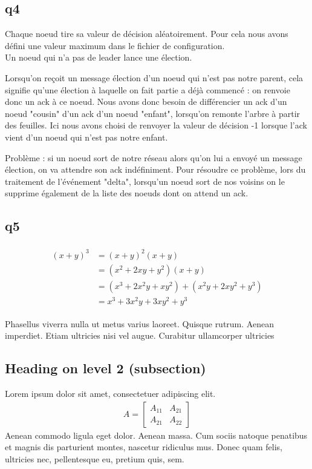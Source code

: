 \documentclass[paper=a4, fontsize=11pt]{report} %
\begin{document}
\subsection{q4}
Chaque noeud tire sa valeur de décision aléatoirement. Pour cela nous avons défini une valeur maximum dans le fichier de configuration.\\
Un noeud qui n'a pas de leader lance une élection.

Lorsqu'on reçoit un message élection d'un noeud qui n'est pas notre parent, cela signifie qu'une élection à laquelle on fait partie a déjà commencé : on renvoie donc un ack à ce noeud.
Nous avons donc besoin de différencier un ack d'un noeud "cousin" d'un ack d'un noeud "enfant", lorsqu'on remonte l'arbre à partir des feuilles.
Ici nous avons choisi de renvoyer la valeur de décision -1 lorsque l'ack vient d'un noeud qui n'est pas notre enfant. 

Problème : si un noeud sort de notre réseau alors qu'on lui a envoyé un message élection, on va attendre son ack indéfiniment. 
Pour résoudre ce problème, lors du traitement de l'événement "delta", lorsqu'un noeud sort de nos voisins on le supprime également de la liste des noeuds dont on attend un ack.

\subsection{q5}

\lipsum[2] %

\begin{align} 
\begin{split}
(x+y)^3 	&= (x+y)^2(x+y)\\
&=(x^2+2xy+y^2)(x+y)\\
&=(x^3+2x^2y+xy^2) + (x^2y+2xy^2+y^3)\\
&=x^3+3x^2y+3xy^2+y^3
\end{split}					
\end{align}

Phasellus viverra nulla ut metus varius laoreet. Quisque rutrum. Aenean imperdiet. Etiam ultricies nisi vel augue. Curabitur ullamcorper ultricies


\subsection{Heading on level 2 (subsection)}

Lorem ipsum dolor sit amet, consectetuer adipiscing elit. 
\begin{align}
A = 
\begin{bmatrix}
A_{11} & A_{21} \\
A_{21} & A_{22}
\end{bmatrix}
\end{align}
Aenean commodo ligula eget dolor. Aenean massa. Cum sociis natoque penatibus et magnis dis parturient montes, nascetur ridiculus mus. Donec quam felis, ultricies nec, pellentesque eu, pretium quis, sem.
\end{document}
